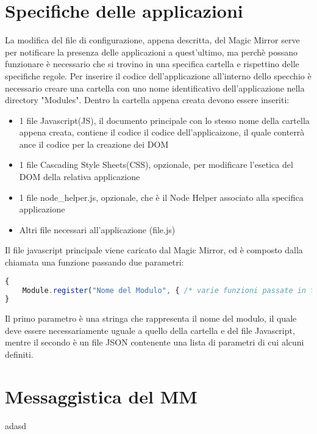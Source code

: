 \section{Specifiche delle applicazioni}
La modifica del file di configurazione, appena descritta, del Magic Mirror serve per notificare la presenza delle applicazioni a quest'ultimo,
ma perchè possano funzionare è necessario che si trovino in una specifica cartella e rispettino delle specifiche regole.
Per inserire il codice dell'applicazione all'interno dello specchio è necessario creare una cartella con uno nome identificativo dell'applicazione
nella directory "Modules".
Dentro la cartella appena creata devono essere inseriti:
\begin{itemize}
\item 1 file Javascript(JS), il documento principale con lo stesso nome della cartella appena creata, contiene il codice il codice dell'applicaizone, il quale
conterrà ance il codice per la creazione dei DOM
\item 1 file Cascading Style Sheets(CSS), opzionale, per modificare l'esetica del DOM della relativa applicazione
\item 1 file node\_helper.js, opzionale, che è il Node Helper associato alla specifica applicazione
\item Altri file necessari all'applicazione (file.js)
\end{itemize}
Il file javascript principale viene caricato dal Magic Mirror, ed è composto dalla chiamata una funzione passando due parametri:
\begin{lstlisting}[language=JavaScript]
{
	Module.register("Nome del Modulo", { /* varie funzioni passate in formato json */});
}
\end{lstlisting}
Il primo parametro è una stringa che rappresenta il nome del modulo, il quale deve essere necessariamente uguale a quello della cartella e del file Javascript,
mentre il secondo è un file JSON contenente una lista di parametri di cui alcuni definiti.

\section{Messaggistica del MM}
adasd

